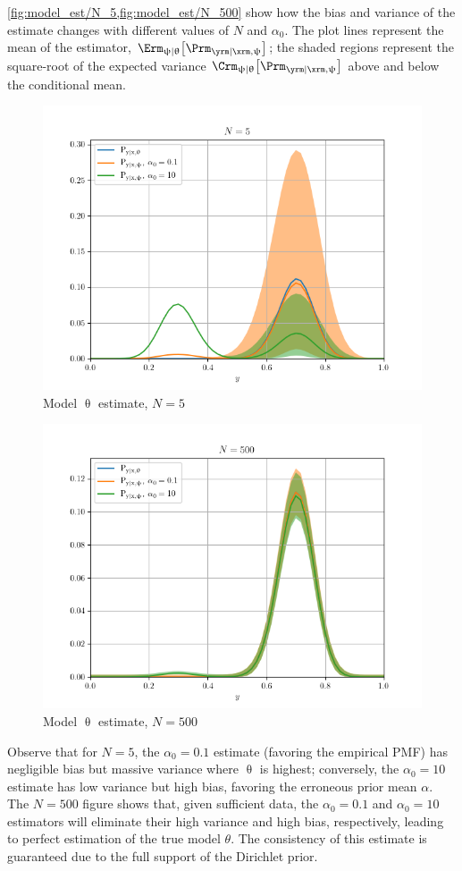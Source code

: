 \documentclass[12pt]{report}
\begin{document}
\cref{fig:model_est/N_5,fig:model_est/N_500} show how the bias and variance of the estimate changes with different values of $N$ and $\alpha_0$. The plot lines represent the mean of the estimator, $\Erm_{\uppsi | \uptheta}\big[ \Prm_{\yrm | \xrm,\uppsi} \big]$; the shaded regions represent the square-root of the expected variance $\Crm_{\uppsi | \uptheta}\big[ \Prm_{\yrm | \xrm,\uppsi} \big]$ above and below the conditional mean. 
\begin{figure}
	\centering
	\includegraphics[width=0.8\linewidth]{model_est/N_5.png}
	\caption{Model $\uptheta$ estimate, $N=5$}
	\label{fig:model_est/N_5}
\end{figure}
\begin{figure}
	\centering
	\includegraphics[width=0.8\linewidth]{model_est/N_500.png}
	\caption{Model $\uptheta$ estimate, $N=500$}
	\label{fig:model_est/N_500}
\end{figure}

Observe that for $N = 5$, the $\alpha_0 = 0.1$ estimate (favoring the empirical PMF) has negligible bias but massive variance where $\uptheta$ is highest; conversely, the $\alpha_0 = 10$ estimate has low variance but high bias, favoring the erroneous prior mean $\alpha$. The $N=500$ figure shows that, given sufficient data, the $\alpha_0 = 0.1$ and $\alpha_0 = 10$ estimators will eliminate their high variance and high bias, respectively, leading to perfect estimation of the true model $\theta$. The consistency of this estimate is guaranteed due to the full support of the Dirichlet prior.
\end{document}

